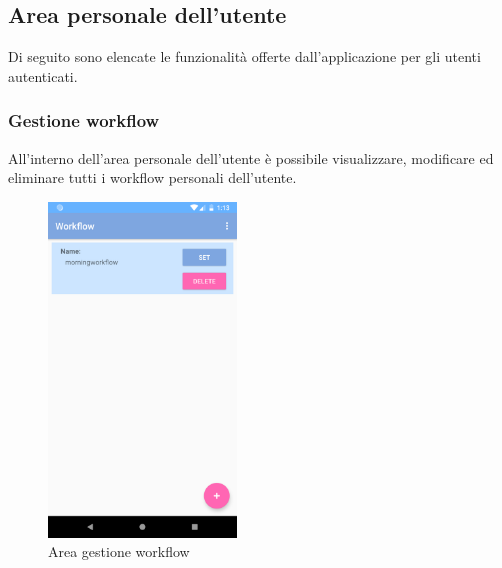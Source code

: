 \subsection{Area personale dell'utente}
\label{sec:sec_area_personale_utente}
Di seguito sono elencate le funzionalità offerte dall'applicazione per gli utenti autenticati.
\subsubsection{Gestione workflow}
All'interno dell'area personale dell'utente è possibile visualizzare, modificare ed eliminare tutti i workflow personali dell'utente.
\begin{figure}[H]
	\centering
	\includegraphics[width=5cm]{../includes/pics/area_workflow_utente.png}
	\caption{\label{fig:area_workflow_utente}Area gestione workflow}
\end{figure}
